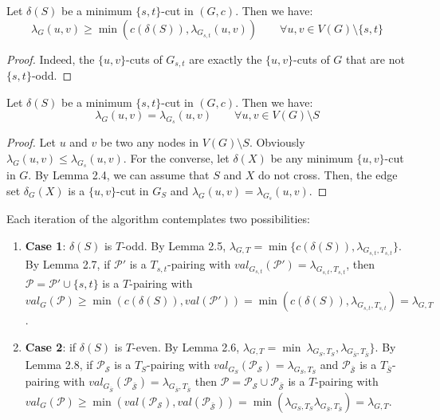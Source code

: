 \begin{lemma}
Let $\delta(S)$ be a minimum $\{s,t\}$-cut in $(G,c)$. Then we have: 
\[
\lambda_G (u,v) \ge \min(c(\delta(S)), \lambda_{G_{s,t}}(u,v)) \qquad \forall u,v \in V(G) \setminus \{s,t\}
\]
\end{lemma}

\begin{proof}
Indeed, the $\{u,v\}$-cuts of $G_{s,t}$ are exactly the $\{u,v\}$-cuts of $G$ that are not $\{s,t\}$-odd.
\end{proof}

\begin{lemma}
Let $\delta(S)$ be a minimum $\{s,t\}$-cut in $(G,c)$. Then we have: 
\[
\lambda_G (u,v) = \lambda_{G_{s}} (u,v) \qquad \forall u,v \in V(G) \setminus S
\]
\end{lemma}

\begin{proof}
Let $u$ and $v$ be two any nodes in $V(G) \setminus S$. Obviously $\lambda_G (u,v) \le \lambda_{G_{s}} (u,v)$. For the converse, let $\delta(X)$ be any minimum $\{u,v\}$-cut in $G$. By Lemma 2.4, we can assume that $S$ and $X$ do not cross. Then, the edge set $\delta_{G}(X)$ is a $\{u,v\}$-cut in $G_S$ and $\lambda_G (u,v) = \lambda_{G_{s}} (u,v)$.
\end{proof}

Each iteration of the algorithm contemplates two possibilities: 
\begin{enumerate}
\item \textbf{Case 1}: $\delta(S)$ is $T$-odd. By Lemma 2.5, $\lambda_{G,T} = \min\{c(\delta(S)), \lambda_{G_{s,t},T_{s,t}}\}$. By Lemma 2.7, if $\mathcal{P'}$ is a $T_{s,t}$-pairing with $val_{G_{s,t}}(\mathcal{P'}) = \lambda_{G_{s,t},T_{s,t}}$, then $\mathcal{P} = \mathcal{P'} \cup \{s,t\}$ is a $T$-pairing with $val_{G} (\mathcal{P}) \ge \min(c(\delta(S)), val(\mathcal{P'})) = \min(c(\delta(S)), \lambda_{G_{s,t},T_{s,t}}) = \lambda_{G,T}$. \\
\item \textbf{Case 2}: if $\delta(S)$ is $T$-even. By Lemma 2.6, $\lambda_{G,T} = \min\ \lambda_{G_{S},T_{S}}, \lambda_{G_{\bar{S}},T_{\bar{S}}}\}$. By Lemma 2.8, if $\mathcal{P_S}$ is a $T_{S}$-pairing with $val_{G_{S}} (\mathcal{P_S}) = \lambda_{G_{S},T_{S}}$ and $\mathcal{P_{\bar{S}}}$ is a $T_{\bar{S}}$-pairing with $val_{G_{\bar{S}}} (\mathcal{P_{\bar{S}}}) = \lambda_{G_{\bar{S}},T_{\bar{S}}}$ then $\mathcal{P} = \mathcal{P_S} \cup \mathcal{P_{\bar{S}}}$ is a $T$-pairing with $val_{G} (\mathcal{P}) \ge \min(val(\mathcal{P_S}), val(\mathcal{P_{\bar{S}}})) = \min(\lambda_{G_{S},T_{S}}\lambda_{G_{\bar{S}},T_{\bar{S}}}) = \lambda_{G,T}$.
\end{enumerate}  


